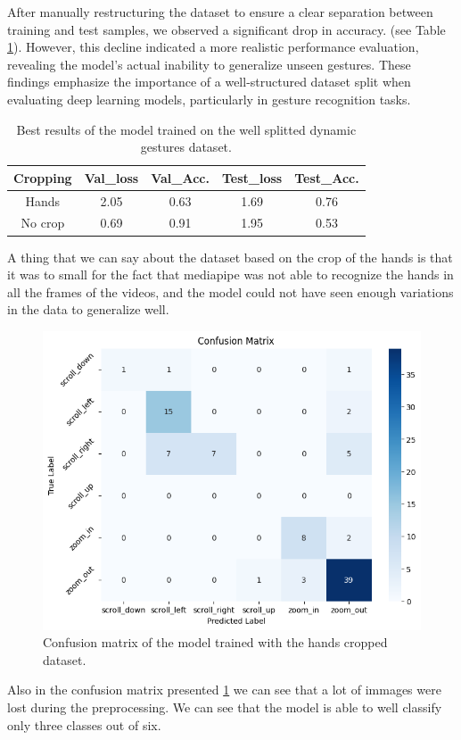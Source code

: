 \documentclass[10pt,twocolumn,letterpaper]{article}
\begin{document}
After manually restructuring the dataset to ensure a clear separation between training and test samples, we observed a significant drop in accuracy. 
(see Table \ref{tab:dynamicGesturesWell}).
However, this decline indicated a more realistic performance evaluation, 
revealing the model's actual inability to generalize unseen gestures.  
These findings emphasize the importance of a well-structured dataset split when evaluating deep 
learning models, particularly in gesture recognition tasks.
\begin{table}[h]
   \begin{center}
   \begin{tabular}{|c|c|c|c|c|}
   \hline
   \textbf{Cropping} & \textbf{Val\_loss} & \textbf{Val\_Acc.} & \textbf{Test\_loss} & \textbf{Test\_Acc.}\\
   \hline\hline
   Hands & 2.05 & 0.63 & 1.69 & 0.76 \\
   No crop & 0.69 & 0.91 & 1.95 & 0.53 \\
   \hline
   \end{tabular}
   \end{center}
   \caption{Best results of the model trained on the well splitted dynamic gestures dataset.}
   \label{tab:dynamicGesturesWell}
\end{table}
A thing that we can say about the dataset based on the crop of the hands is that it was to small for the 
fact that mediapipe was not able to recognize the hands in all the frames of the videos, and the model 
could not have seen enough variations in the data to generalize well. \\
\begin{figure}[h]
   \centering
   \includegraphics[width=1\linewidth]{images/rightDatasetHandsCrop.png}
   \caption{Confusion matrix of the model trained with the hands cropped dataset.}
   \label{fig:handCropConfusionMatrix}
\end{figure}
Also in the confusion matrix presented \ref{fig:handCropConfusionMatrix} we can see that a lot of immages 
were lost during the preprocessing. We can see that the model is able to well classify only three classes out 
of six.
\end{document}
